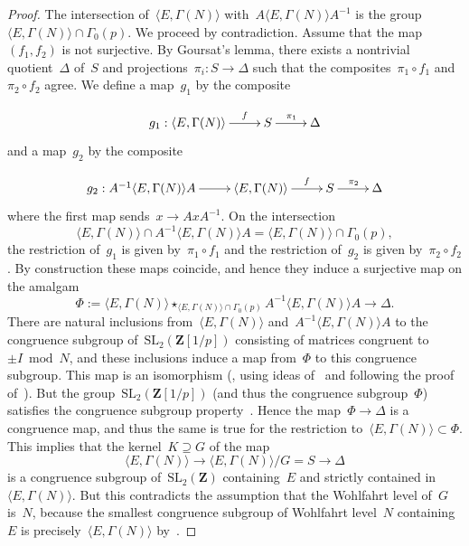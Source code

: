 \documentclass[10pt]{amsart}
\def\Z{\mathbf{Z}}
\theoremstyle{remark}
\numberwithin{equation}{subsection}
\def\numequation{\addtocounter{subsubsection}{1}\begin{equation}}
\def\SL{\mathrm{SL}}
\begin{document}
\begin{proof} 
The intersection of~$\langle E,\Gamma(N) \rangle$ with~$A \langle E,\Gamma(N) \rangle A^{-1}$ is
the group~$\langle E,\Gamma(N) \rangle \cap \Gamma_0(p)$. 
We proceed by contradiction.
Assume that the map~$(f_1,f_2)$ is not surjective. By Goursat's lemma, there exists a nontrivial 
quotient~$\Delta$ of~$S$  and projections~$\pi_i: S \rightarrow \Delta$ such that the composites~$\pi_1 \circ f_1$ 
and~$\pi_2 \circ f_2$ agree.  
We define a map~$g_1$ by the composite
\numequation
 \xymatrix{g_1:   \langle  E,\Gamma(N)\rangle \ar[r]^-{f} & S \ar[r]^{\pi_1} & \Delta} 
 \end{equation}
and a map~$g_2$ by the composite
\numequation
 \xymatrix{g_2:   A^{-1} \langle  E,\Gamma(N)\rangle A
 \ar[r] & \langle  E,\Gamma(N)\rangle \ar[r]^-{f} & S \ar[r]^{\pi_2} & \Delta} 
 \end{equation}
 where the first map sends~$x \rightarrow A x A^{-1}$. On the intersection
 $$\langle  E,\Gamma(N) \rangle \cap  A^{-1} \langle  E,\Gamma(N)\rangle A
 = \langle  E,\Gamma(N) \rangle  \cap \Gamma_0(p),$$
 the restriction of~$g_1$ is given by~$\pi_1 \circ f_1$ and the restriction of~$g_2$
 is given by~$\pi_2 \circ f_2$. By construction these maps coincide, and hence
 they induce a surjective map on the amalgam
 $$\Phi:=\langle E,\Gamma(N) \rangle  \star_{\langle  E,\Gamma(N) \rangle  \cap \Gamma_0(p)} 
  A^{-1} \langle  E,\Gamma(N)\rangle A \rightarrow \Delta.$$
There are natural inclusions from~$\langle E,\Gamma(N) \rangle $ and~$ A^{-1} \langle  E,\Gamma(N)\rangle A$ 
to the  congruence subgroup of~$\SL_2(\Z[1/p])$ consisting of matrices congruent to~$\pm I \bmod N$, and these inclusions
induce a map from~$\Phi$ to this congruence subgroup.
This map is an isomorphism (\cite[p.919]{Berger}, using ideas of~\cite{Trees} and following the proof of~\cite[Theorem~3]{SerreThompson}).
But the group~$\SL_2(\Z[1/p])$ (and thus the congruence subgroup~$\Phi$) satisfies
the congruence subgroup property~\cite{Mennicke,SerreSL2}. Hence the map~$\Phi \rightarrow \Delta$
is a congruence map, and thus the same is true for the restriction to~$\langle E,\Gamma(N) \rangle \subset \Phi$.
This implies that the kernel~$K \supseteq G$ of the map 
$$\langle E, \Gamma(N)\rangle  \rightarrow  \langle E, \Gamma(N)\rangle/G = S \rightarrow \Delta$$
is a congruence subgroup of~$\SL_2(\Z)$ containing~$E$ and strictly contained in~$\langle E,\Gamma(N)\rangle$.
But this contradicts the assumption that the Wohlfahrt level  of~$G$ is~$N$, because the smallest congruence
 subgroup of Wohlfahrt level~$N$ containing~$E$ is precisely~$\langle E,\Gamma(N)\rangle$
 by~\cite[Theorem~2]{Wohlfahrt}.
 \end{proof}
\end{document}
